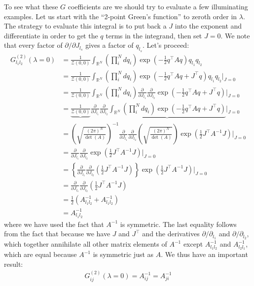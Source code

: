 \documentclass{book}
\theoremstyle{definition}
\newcommand{\p}{\partial}
\newcommand{\f}[2]{\frac{#1}{#2}}
\newcommand{\lp}{\left(}
\newcommand{\rp}{\right)}
\newcommand{\lc}{\left\{}
\newcommand{\rc}{\right\}}
\newcommand{\Z}{\mathcal{Z}}
\begin{document}
To see what these $G$ coefficients are we should try to evaluate a few illuminating examples. Let us start with the ``2-point Green's function'' to zeroth order in $\lambda$. The strategy to evaluate this integral is to put back a $J$ into the exponent and differentiate in order to get the $q$ terms in the integrand, then set $J=0$. We note that every factor of $\p / \p J_{l_s}$ gives a factor of $q_{l_s}$. Let's proceed:
\begin{align}
G^{(2)}_{l_1l_2}(\lambda = 0) &= \f{1}{\Z(0,0)}\int_{\mathbb{R}^N} \lp\prod_i^N dq_i \rp \exp\lp -\f{1}{2}q^\top A q  \rp q_{l_1}q_{l_2} \nonumber \\ 
&= \f{1}{\Z(0,0)}\int_{\mathbb{R}^N} \lp\prod_i^N dq_i \rp \exp\lp -\f{1}{2}q^\top A q  + J^\top q  \rp q_{l_1}q_{l_2}\bigg\vert_{J=0}\nonumber\\
&= \f{1}{\Z(0,0)}\int_{\mathbb{R}^N} \lp\prod_i^N dq_i \rp \f{\p}{\p J_{l_1}} \f{\p}{\p J_{l_2}} \exp\lp -\f{1}{2}q^\top A q  + J^\top q  \rp \bigg\vert_{J=0}\nonumber\\
&= \underbrace{\f{1}{\Z(0,0)}}\f{\p}{\p J_{l_1}} \f{\p}{\p J_{l_2}} \underbrace{ \int_{\mathbb{R}^N} \lp\prod_i^N dq_i \rp  \exp\lp -\f{1}{2}q^\top A q  + J^\top q  \rp} \bigg\vert_{J=0}\nonumber\\
&= \lp \sqrt{\f{(2\pi)^N}{\det(A)}}\rp^{-1}\f{\p}{\p J_{l_1}} \f{\p}{\p J_{l_2}} \lp\sqrt{\f{(2\pi)^N}{\det(A)}}\rp\exp\lp \f{1}{2} J^\top A^{-1}J \rp \bigg\vert_{J=0} \nonumber\\
&= \f{\p}{\p J_{l_1}} \f{\p}{\p J_{l_2}} \exp\lp \f{1}{2} J^\top A^{-1}J \rp \bigg\vert_{J=0}\nonumber\\
&= \lc\f{\p}{\p J_{l_1}} \f{\p}{\p J_{l_2}}\lp \f{1}{2}J^\top A^{-1}J \rp \rc \exp\lp \f{1}{2} J^\top A^{-1}J \rp \bigg\vert_{J=0}\nonumber\\
&= \f{\p}{\p J_{l_1}} \f{\p}{\p J_{l_2}} \lp \f{1}{2}J^\top A^{-1}J\rp \nonumber\\
&= \f{1}{2}\lp A^{-1}_{l_1l_2} + A^{-1}_{l_1l_2} \rp \nonumber\\
&= \boxed{A^{-1}_{l_1l_2}}
\end{align}
where we have used the fact that $A^{-1}$ is symmetric. The last equality follows from the fact that because we have $J$ and $J^\top$ and the derivatives $\p / \p_{l_1}$ and $\p / \p_{l_2}$, which together annihilate all other matrix elements of $A^{-1}$ except $A^{-1}_{l_1l_2}$ and $A^{-1}_{l_2l_1}$, which are equal because $A^{-1}$ is symmetric just as $A$. We thus have an important result:
\begin{align}
\boxed{G^{(2)}_{ij}(\lambda = 0) = A^{-1}_{ij} = A^{-1}_{ji}}
\end{align}
\end{document}

